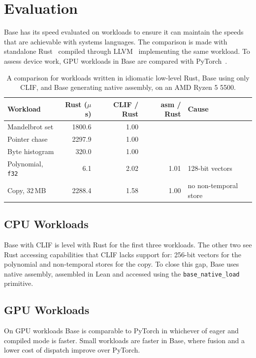 \documentclass[11pt]{article}
\begin{document}
\section{Evaluation}
\label{sec:evaluation}

Base has its speed evaluated on workloads to ensure it can maintain the speeds
that are achievable with systems languages. The comparison is made with
standalone Rust~\cite{rust} compiled through LLVM~\cite{llvm} implementing the same
workload. To assess device work, GPU workloads in Base are compared with
PyTorch~\cite{pytorch}.

\begin{table}[H]
\centering
\caption{A comparison for workloads written in idiomatic low-level Rust, Base
using only CLIF, and Base generating native assembly, on an AMD Ryzen 5 5500.}
\label{tab:cpu}
\begin{tabular}{@{}lrrrl@{}}
\toprule
Workload & Rust ($\mu$s) & CLIF / Rust & asm / Rust & Cause \\
\midrule
Mandelbrot set & 1800.6 & 1.00 & & \\
Pointer chase & 2297.9 & 1.00 & & \\
Byte histogram & 320.0 & 1.00 & & \\
\midrule
Polynomial, \texttt{f32} & 6.1 & 2.02 & 1.01 & 128-bit vectors \\
Copy, 32\,MB & 2288.4 & 1.58 & 1.00 & no non-temporal store \\
\bottomrule
\end{tabular}
\end{table}

\subsection{CPU Workloads}

Base with CLIF is level with Rust for the first three workloads. The other two
see Rust accessing capabilities that CLIF lacks support for: 256-bit vectors for
the polynomial and non-temporal stores for the copy. To close this gap, Base uses native
assembly, assembled in Lean and accessed using the \texttt{base\_native\_load}
primitive.

\subsection{GPU Workloads}

On GPU workloads Base is comparable to PyTorch in whichever of eager and
compiled mode is faster. Small workloads are faster in Base, where fusion and a
lower cost of dispatch improve over PyTorch.
\end{document}
